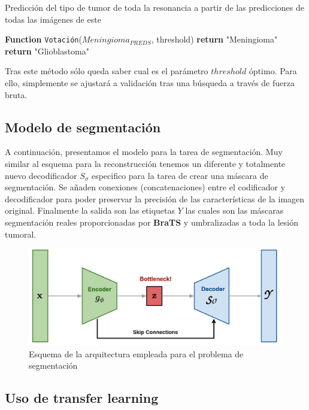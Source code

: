 \begin{algorithm}
	\caption{Predicción del tipo de tumor de toda la resonancia a partir de las predicciones de todas las imágenes de este}
	\begin{algorithmic}[1]
		\STATE \textbf{Function} \texttt{Votación}($Meningioma_{PREDS}$, threshold)
		\STATE \textbf{return} "Meningioma"
		\ELSE
		\STATE \textbf{return} "Glioblastoma"
		\ENDIF
	\end{algorithmic}
\end{algorithm}

Tras este método sólo queda saber cual es el parámetro $threshold$ óptimo. Para ello, simplemente se ajustará a validación tras una búsqueda a través de fuerza bruta.

\subsection{Modelo de segmentación}

A continuación, presentamos el modelo para la tarea de segmentación. Muy similar al esquema para la reconstrucción tenemos un diferente y totalmente nuevo decodificador $S_{\sigma}$ especifico para la tarea de crear una máscara de segmentación. Se añaden conexiones (concatenaciones) entre el codificador y decodificador para poder preservar la precisión de las características de la imagen original. Finalmente la salida son las etiquetas $Y$ las cuales son las máscaras segmentación reales proporcionadas por \textbf{BraTS} y umbralizadas a toda la lesión tumoral.


\begin{figure}[H]
	\centering
	\includegraphics[width=0.9\linewidth]{imagenes/esquema_segmentacion.png}
	\caption{Esquema de la arquitectura empleada para el problema de segmentación}
\end{figure}

\subsection{Uso de transfer learning}

